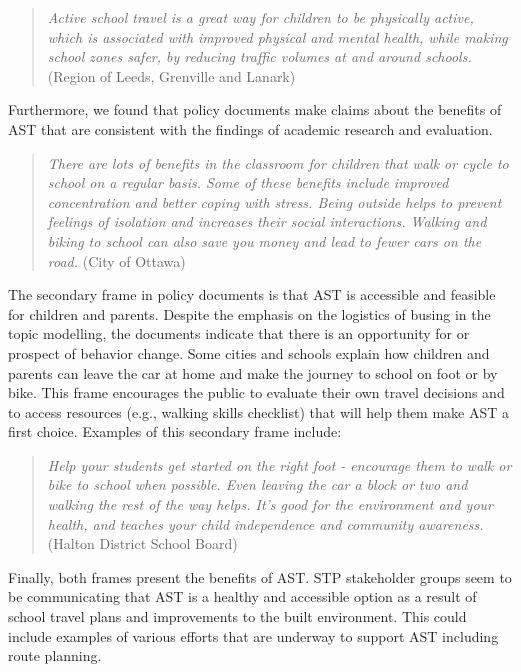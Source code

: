 \documentclass[preprint, 3p,
authoryear]{elsarticle} %
\begin{document}
\begin{quote}
\emph{Active school travel is a great way for children to be physically
active, which is associated with improved physical and mental health,
while making school zones safer, by reducing traffic volumes at and
around schools.}(Region of Leeds, Grenville and Lanark)
\end{quote}

Furthermore, we found that policy documents make claims about the
benefits of AST that are consistent with the findings of academic
research and evaluation.

\begin{quote}
\emph{There are lots of benefits in the classroom for children that walk
or cycle to school on a regular basis. Some of these benefits include
improved concentration and better coping with stress. Being outside
helps to prevent feelings of isolation and increases their social
interactions. Walking and biking to school can also save you money and
lead to fewer cars on the road.} (City of Ottawa)
\end{quote}

The secondary frame in policy documents is that AST is accessible and
feasible for children and parents. Despite the emphasis on the logistics
of busing in the topic modelling, the documents indicate that there is
an opportunity for or prospect of behavior change. Some cities and
schools explain how children and parents can leave the car at home and
make the journey to school on foot or by bike. This frame encourages the
public to evaluate their own travel decisions and to access resources
(e.g., walking skills checklist) that will help them make AST a first
choice. Examples of this secondary frame include:

\begin{quote}
\emph{Help your students get started on the right foot - encourage them
to walk or bike to school when possible. Even leaving the car a block or
two and walking the rest of the way helps. It's good for the environment
and your health, and teaches your child independence and community
awareness.} (Halton District School Board)
\end{quote}

Finally, both frames present the benefits of AST. STP stakeholder groups
seem to be communicating that AST is a healthy and accessible option as
a result of school travel plans and improvements to the built
environment. This could include examples of various efforts that are
underway to support AST including route planning.
\end{document}
